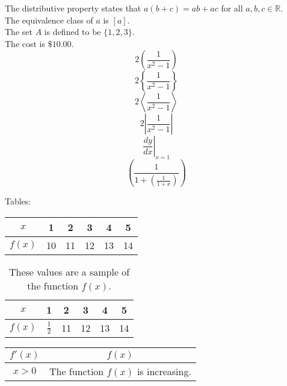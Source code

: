 \documentclass[12pt]{article}
\begin{document}
The distributive property states that $a(b+c)=ab+ac$ for all $a,b,c\in\mathbb{R}$.\\[6pt] %
The equivalence class of $a$ is $[a]$.\\
The set $A$ is defined to be $\{1,2,3\}$.\\
The cost is $\$10.00$.\\
$$2\left(\frac{1}{x^2-1}\right)$$
$$2\left\{\frac{1}{x^2-1}\right\}$$
$$2\left\langle\frac{1}{x^2-1}\right\rangle$$
$$2\left|\frac{1}{x^2-1}\right|$$
$$\left.\frac{dy}{dx}\right|_{x=1}$$
$$\left(\frac{1}{1+\left(\frac{1}{1+x}\right)}\right)$$

Tables:

\begin{tabular}{|c||c|c|c|c|c|}
\hline
$x$ & 1 & 2 & 3 & 4 & 5 \\  %
\hline %
$f(x)$ & 10 & 11 & 12 & 13 & 14 \\
\hline
\end{tabular}

\vspace{1cm}

\begin{table}[H]
\centering %
\def\arraystretch{3} %
\begin{tabular}{|c||c|c|c|c|c|}
\hline
$x$ & 1 & 2 & 3 & 4 & 5 \\  %
\hline %
$f(x)$ & $\frac{1}{2}$ & 11 & 12 & 13 & 14 \\
\hline
\end{tabular}
\caption{These values are a sample of the function $f(x)$.}
\end{table}

\begin{table}[H]
\centering %
\def\arraystretch{1.5} %
\begin{tabular}{|c|c|}
\hline
$f'(x)$ & $f(x)$ \\  %
\hline %
$x>0$ & The function $f(x)$ is increasing. \\
\hline
\end{tabular}
\end{table}
\end{document}
